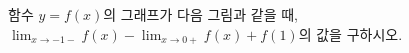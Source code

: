 함수 $y=f(x)$의 그래프가 다음 그림과 같을 때, $\displaystyle\lim_{x\to-1-} f(x)-\lim_{x\to 0+} f(x)+f(1)$의 값을 구하시오.
\par\smallskip\begin{center}\resizebox{\ifdim\width>\linewidth\linewidth\else\width\fi}{!}{}\end{center}
